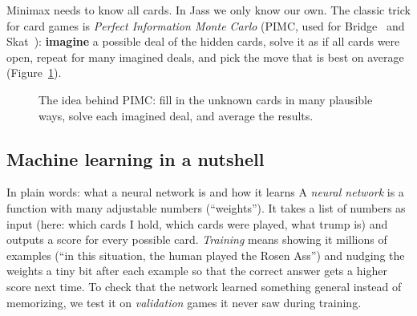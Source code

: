 \documentclass[10pt,a4paper]{article}
\begin{document}
Minimax needs to know all cards. In Jass we only know our own. The classic trick for card games is
\emph{Perfect Information Monte Carlo} (PIMC, used for Bridge~\cite{gib} and Skat~\cite{skat}): \textbf{imagine} a
possible deal of the hidden cards, solve it as if all cards were open, repeat for many imagined deals, and pick the move
that is best on average (Figure~\ref{fig:sampling}).

\begin{figure}[h]
\centering
{}
\caption{The idea behind PIMC: fill in the unknown cards in many plausible ways, solve each imagined deal,
and average the results.}
\label{fig:sampling}
\end{figure}

\subsection{Machine learning in a nutshell}
\begin{plain}{In plain words: what a neural network is and how it learns}
A \emph{neural network} is a function with many adjustable numbers (``weights''). It takes a list of numbers as input
(here: which cards I hold, which cards were played, what trump is) and outputs a score for every possible card.
\emph{Training} means showing it millions of examples (``in this situation, the human played the Rosen Ass'') and
nudging the weights a tiny bit after each example so that the correct answer gets a higher score next time.
To check that the network learned something general instead of memorizing, we test it on \emph{validation} games it
never saw during training.
\end{plain}
\end{document}
